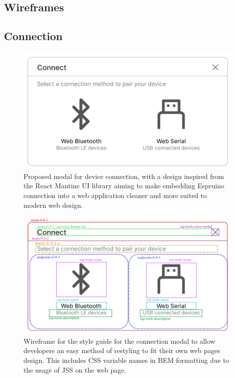 \documentclass{l4proj}
\begin{document}
\begin{appendices}
\chapter{Wireframes}
\label{appendix:wireframes}

\section{Connection}

\begin{figure}[H]
    \centering
    \includegraphics[width=12cm]{dissertation/images/wireframe-connection.png}
    \caption{Proposed modal for device connection, with a design inspired from the React Mantine UI library aiming to make embedding Espruino connection into a web application cleaner and more suited to modern web design.}
    \label{fig:connection-wireframe}
\end{figure}

\begin{figure}[H]
    \centering
    \includegraphics[width=12cm]{dissertation/images/wireframe-connection-style-guide.png}
    \caption{Wireframe for the style guide for the connection modal to allow developers an easy method of restyling to fit their own web pages design. This includes CSS variable names in BEM formatting due to the usage of JSS on the web page.}
    \label{fig:connection-style-wireframe}
\end{figure}


\end{appendices}
\end{document}
